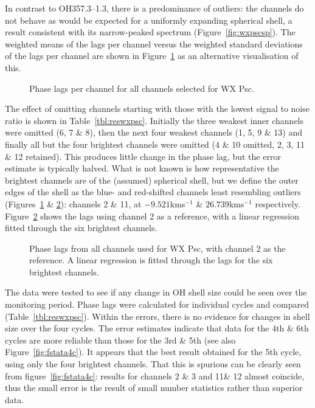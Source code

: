 \documentclass[usenatbib,usegraphicx]{mn2e}
\begin{document}
In contrast to OH357.3--1.3, there is a predominance of outliers: the
channels do not behave as would be expected for a uniformly expanding
spherical shell, a result consistent with its narrow-peaked spectrum
(Figure~\ref{fig:wxpscsp}). The weighted means of the lags per channel
versus the weighted standard deviations of the lags per channel are shown in
Figure~\ref{fig:fstat4cn} as an alternative visualisation of this.


\begin{figure}
\caption{Phase lags per channel for all channels selected for WX Psc.}
\label{fig:fstat4cn}
\end{figure}

The effect of omitting channels starting with those with the lowest signal
to noise ratio is shown in Table~\ref{tbl:reswxpsc}. Initially the three
weakest inner channels were omitted (6, 7 \& 8), then the next four weakest
channels (1, 5, 9 \& 13) and finally all but the four brightest channels
were omitted (4 \& 10 omitted, 2, 3, 11 \& 12 retained).  This produces
little change in the phase lag, but the error estimate is typically halved. 
What is not known is how representative the brightest channels are of the
(assumed) spherical shell, but we define the outer edges of the shell as the
blue- and red-shifted channels least resembling outliers
(Figures~\ref{fig:fstat4cn} \& \ref{fig:pldiags}): channels 2 \& 11, at
$-9.521$kms$^{-1}$ \& $26.739$kms$^{-1}$ respectively.
Figure~\ref{fig:pldiags} shows the lags using channel 2 as a reference, with
a linear regression fitted through the six brightest channels.


\begin{figure}
\caption{Phase lags from all channels used for WX Psc, with channel 2
as the reference.  A linear regression is fitted through the lags
for the six brightest channels.}
\label{fig:pldiags}
\end{figure}


The data were tested to see if any change in OH shell size could be seen
over the monitoring period. Phase lags were calculated for individual cycles
and compared (Table~\ref{tbl:reswxpsc}).  Within the errors, there is no
evidence for changes in shell size over the four cycles.  The error
estimates indicate that data for the 4th \& 6th cycles are more reliable
than those for the 3rd \& 5th (see also Figure~\ref{fig:fstata4c}).  It
appears that the best result obtained for the 5th cycle, using only the four
brightest channels.  That this is spurious can be clearly seen from
figure~\ref{fig:fstata4c}: results for channels 2 \& 3 and 11\& 12 almost
coincide, thus the small error is the result of small number statistics
rather than superior data.
\end{document}
